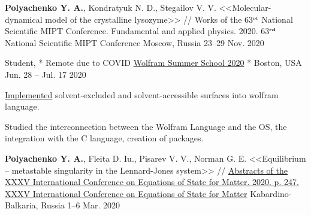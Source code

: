 

\begin{cventries}

  \cventry
    {\textbf{Polyachenko Y. A.}, Kondratyuk N. D., Stegailov V. V. <<Molecular-dynamical model of the crystalline lysozyme>> // Works of the 63$^{\texttt{\tiny rd}}$ National Scientific MIPT Conference. Fundamental and applied physics. 2020.} %
    {63$^{\textbf{\tiny rd}}$ National Scientific MIPT Conference} %
    {Moscow, Russia} %
    {23--29 Nov. 2020} %
    {
    }

  \cventry
    {Student, * Remote due to COVID} %
    {\href{https://education.wolfram.com/summer/school/}{Wolfram Summer School 2020}} %
    {* Boston, USA} %
    {Jun. 28 -- Jul. 17 2020} %
    {
      \begin{cvitems} %
        \item {\href{https://community.wolfram.com/groups/-/m/t/2029621}{Implemented} solvent-excluded and solvent-accessible surfaces into wolfram language.}      
        \item {Studied the interconnection between the Wolfram Language and the OS, the integration with the C language, creation of packages.}
      \end{cvitems}
    }


  \cventry
    {\textbf{Polyachenko Y. A.}, Fleita D. Iu., Pisarev V. V., Norman G. E. <<Equilibrium – metastable singularity in the Lennard-Jones system>> // \href{http://www.ihed.ras.ru/elbrus20/program/restore.php?id=78}{Abstracts of the XXXV International Conference on Equations of State for Matter. 2020. p. 247.}} %
    {\href{http://www.ihed.ras.ru/elbrus20/}{XXXV International Conference on Equations of State for Matter}} %
    {Kabardino-Balkaria, Russia} %
    {1--6 Mar. 2020} %
    {
    }


\end{cventries}
